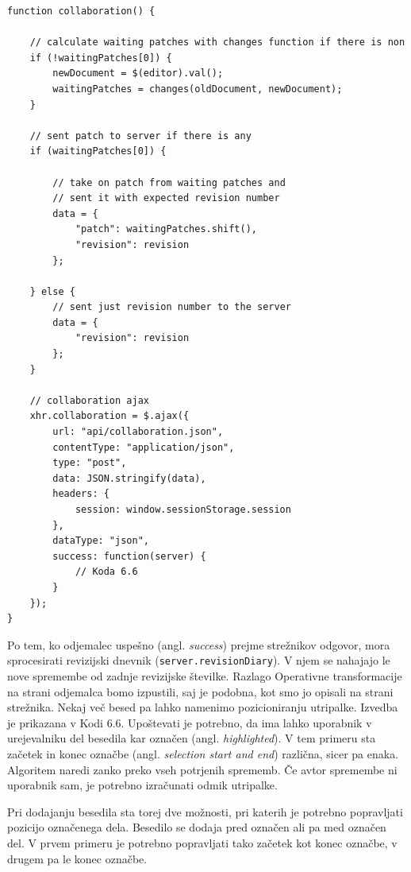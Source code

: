 \documentclass[a4paper, 12pt, twoside]{book}
\begin{document}
\begin{lstlisting}[title={Koda 6.5: Iskanje sprememb v besedilu in AJAX klic na strežnik.}]
function collaboration() {

    // calculate waiting patches with changes function if there is non
    if (!waitingPatches[0]) {
        newDocument = $(editor).val();
        waitingPatches = changes(oldDocument, newDocument);
    }

    // sent patch to server if there is any
    if (waitingPatches[0]) {

        // take on patch from waiting patches and
        // sent it with expected revision number
        data = {
            "patch": waitingPatches.shift(),
            "revision": revision
        };
        
    } else {
        // sent just revision number to the server
        data = {
            "revision": revision
        };
    }

    // collaboration ajax
    xhr.collaboration = $.ajax({
        url: "api/collaboration.json",
        contentType: "application/json",
        type: "post",
        data: JSON.stringify(data),
        headers: {
            session: window.sessionStorage.session
        },
        dataType: "json",
        success: function(server) {
            // Koda 6.6
        }
    });
}
\end{lstlisting}

Po tem, ko odjemalec uspešno (angl. \textit{success}) prejme strežnikov odgovor, mora sprocesirati revizijski dnevnik ({\tt server.revisionDiary}). V njem se nahajajo le nove spremembe od zadnje revizijske številke. Razlago Operativne transformacije na strani odjemalca bomo izpustili, saj je podobna, kot smo jo opisali na strani strežnika. Nekaj več besed pa lahko namenimo pozicioniranju utripalke. Izvedba je prikazana v Kodi 6.6. Upoštevati je potrebno, da ima lahko uporabnik v urejevalniku del besedila kar označen (angl. \textit{highlighted}). V tem primeru sta začetek in konec označbe (angl. \textit{selection start and end}) različna, sicer pa enaka. Algoritem naredi zanko preko vseh potrjenih sprememb. Če avtor spremembe ni uporabnik sam, je potrebno izračunati odmik utripalke.

Pri dodajanju besedila sta torej dve možnosti, pri katerih je potrebno popravljati pozicijo označenega dela. Besedilo se dodaja pred označen ali pa med označen del. V prvem primeru je potrebno popravljati tako začetek kot konec označbe, v drugem pa le konec označbe.
\end{document}
